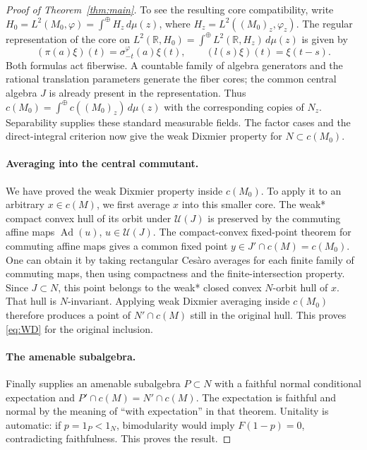 \documentclass[11pt]{article}
\theoremstyle{definition}
\DeclareMathOperator{\Ad}{Ad}
\newcommand{\R}{\mathbb R}
\newcommand{\U}{\mathcal U}
\begin{document}
\begin{proof}[Proof of Theorem~\ref{thm:main}]
To see the resulting core compatibility, write
$H_0=L^2(M_0,\varphi)=\int^\oplus H_z\,d\mu(z)$, where
$H_z=L^2((M_0)_z,\varphi_z)$. The regular representation of the core
on $L^2(\R,H_0)=\int^\oplus L^2(\R,H_z)\,d\mu(z)$ is given by
\[
 (\pi(a)\xi)(t)=\sigma_{-t}^\varphi(a)\xi(t),\qquad
 (l(s)\xi)(t)=\xi(t-s).
\]
Both formulas act fiberwise. A countable family of algebra generators and
the rational translation parameters generate the fiber cores; the common
central algebra $J$ is already present in the representation. Thus
$c(M_0)=\int^\oplus c((M_0)_z)\,d\mu(z)$ with the corresponding copies of
$N_z$. Separability supplies these standard measurable fields. The factor
cases and the direct-integral criterion \cite[Proposition~4.12]{M1} now give
the weak Dixmier property for $N\subset c(M_0)$.

\paragraph{Averaging into the central commutant.}
We have proved the weak Dixmier property inside $c(M_0)$. To apply it
to an arbitrary $x\in c(M)$, we first average $x$ into this smaller core.
The weak* compact convex hull of its orbit under
$\U(J)$ is preserved by the commuting affine maps $\Ad(u)$, $u\in\U(J)$.
The compact-convex fixed-point theorem for commuting affine maps gives a
common fixed point $y\in J'\cap c(M)=c(M_0)$. One can obtain it by taking
rectangular Ces\`aro averages for each finite family of commuting maps,
then using compactness and the finite-intersection property. Since $J\subset N$, this
point belongs to the weak* closed convex $N$-orbit hull of $x$.
That hull is $N$-invariant. Applying weak Dixmier averaging inside $c(M_0)$
therefore produces a point of $N'\cap c(M)$ still in the original hull.
This proves \eqref{eq:WD} for the original inclusion.

\paragraph{The amenable subalgebra.}
Finally \cite[Theorem~D, (3)$\Rightarrow$(4)]{M1} supplies an amenable
subalgebra $P\subset N$ with a faithful normal conditional expectation and
$P'\cap c(M)=N'\cap c(M)$. The expectation is faithful and normal by the
meaning of ``with expectation'' in that theorem. Unitality is automatic:
if $p=1_P<1_N$, bimodularity would imply $F(1-p)=0$, contradicting
faithfulness. This proves the result.
\end{proof}
\end{document}
